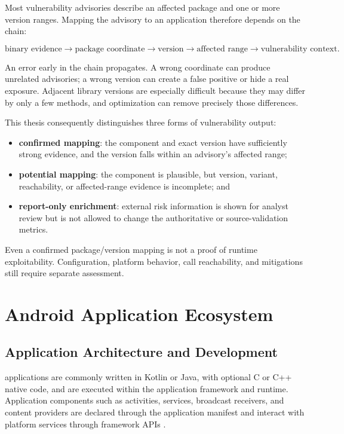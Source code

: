 Most vulnerability advisories describe an affected package and one or more
version ranges. Mapping the advisory to an application therefore depends on
the chain:

\begin{equation}
\label{eq:pfe-background-vulnerability-chain}
\text{binary evidence}
\rightarrow
\text{package coordinate}
\rightarrow
\text{version}
\rightarrow
\text{affected range}
\rightarrow
\text{vulnerability context}.
\end{equation}

An error early in the chain propagates. A wrong coordinate can produce
unrelated advisories; a wrong version can create a false positive or hide a
real exposure. Adjacent library versions are especially difficult because
they may differ by only a few methods, and optimization can remove precisely
those differences.

This thesis consequently distinguishes three forms of vulnerability output:

\begin{itemize}
  \item \textbf{confirmed mapping}: the component and exact version have
  sufficiently strong evidence, and the version falls within an advisory's
  affected range;
  \item \textbf{potential mapping}: the component is plausible, but version,
  variant, reachability, or affected-range evidence is incomplete; and
  \item \textbf{report-only enrichment}: external risk information is shown
  for analyst review but is not allowed to change the authoritative \SBOM or
  source-validation metrics.
\end{itemize}

Even a confirmed package/version mapping is not a proof of runtime
exploitability. Configuration, platform behavior, call reachability, and
mitigations still require separate assessment.

\section{Android Application Ecosystem}

\subsection{Application Architecture and Development}

\Android applications are commonly written in Kotlin or Java, with optional
C or C++ native code, and are executed within the \Android application
framework and runtime. Application components such as activities, services,
broadcast receivers, and content providers are declared through the
application manifest and interact with platform services through framework
APIs \cite{androidAppFundamentals,androidManifestOverview}.

